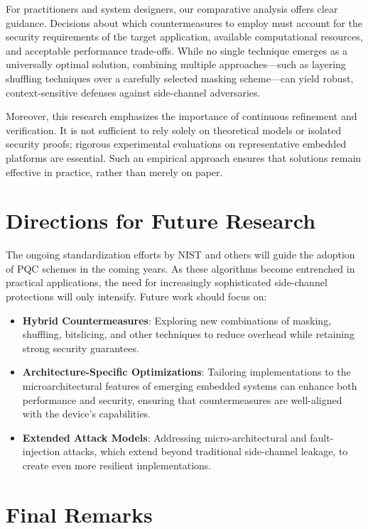 For practitioners and system designers, our comparative analysis offers clear guidance. Decisions about which countermeasures to employ must account for the security requirements of the target application, available computational resources, and acceptable performance trade-offs. While no single technique emerges as a universally optimal solution, combining multiple approaches—such as layering shuffling techniques over a carefully selected masking scheme—can yield robust, context-sensitive defenses against side-channel adversaries.

Moreover, this research emphasizes the importance of continuous refinement and verification. It is not sufficient to rely solely on theoretical models or isolated security proofs; rigorous experimental evaluations on representative embedded platforms are essential. Such an empirical approach ensures that solutions remain effective in practice, rather than merely on paper.

\section{Directions for Future Research}

The ongoing standardization efforts by NIST and others will guide the adoption of PQC schemes in the coming years. As these algorithms become entrenched in practical applications, the need for increasingly sophisticated side-channel protections will only intensify. Future work should focus on:

\begin{itemize}
    \item \textbf{Hybrid Countermeasures}: Exploring new combinations of masking, shuffling, bitslicing, and other techniques to reduce overhead while retaining strong security guarantees.
    \item \textbf{Architecture-Specific Optimizations}: Tailoring implementations to the microarchitectural features of emerging embedded systems can enhance both performance and security, ensuring that countermeasures are well-aligned with the device’s capabilities.
    \item \textbf{Extended Attack Models}: Addressing micro-architectural and fault-injection attacks, which extend beyond traditional side-channel leakage, to create even more resilient implementations.
\end{itemize}

\section{Final Remarks}


